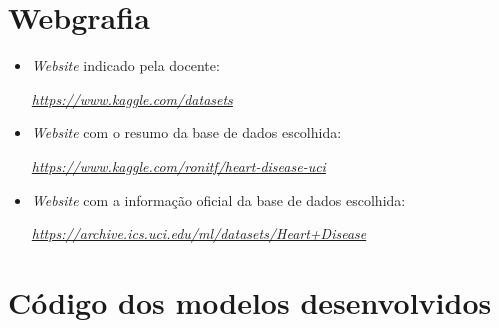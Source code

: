 \documentclass[a4paper]{report}
\begin{document}
\chapter{Webgrafia}
	\begin{itemize}
		\item \textit{Website} indicado pela docente:
		\par \textit{\url{https://www.kaggle.com/datasets}}
        \item \textit{Website} com o resumo da base de dados escolhida:
		\par \textit{\url{https://www.kaggle.com/ronitf/heart-disease-uci}}
		\item \textit{Website} com a informação oficial da base de dados escolhida:
		\par \textit{\url{https://archive.ics.uci.edu/ml/datasets/Heart+Disease}}
	\end{itemize}


\appendix
\chapter{Código dos modelos desenvolvidos}
\end{document}

